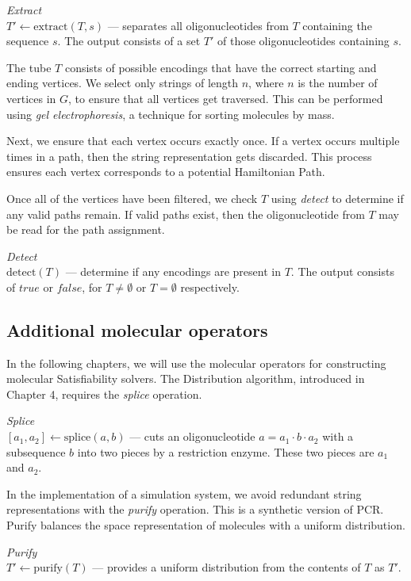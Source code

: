 \begin{definition}
\textit{Extract}\\
$ T' \leftarrow \text{extract}( T, s)$ --- separates all oligonucleotides from $T$ containing the sequence $s$.  The output consists of a set $T'$ of those oligonucleotides containing $s$.
\end{definition}

The tube $T$ consists of possible encodings that have the correct starting and ending vertices. We select only strings of length $n$, where $n$ is the number of vertices in $G$, to ensure that all vertices get traversed.  This can be performed using \textit{gel electrophoresis}, a technique for sorting molecules by mass.

Next, we ensure that each vertex occurs exactly once.  If a vertex occurs multiple times in a path, then the string representation gets discarded.  This process ensures each vertex corresponds to a potential Hamiltonian Path.

Once all of the vertices have been filtered, we check $T$ using \textit{detect} to determine if any valid paths remain.  If valid paths exist, then the oligonucleotide from $T$ may be read for the path assignment.

\begin{definition}
\textit{Detect}\\
$ \text{detect}( T)$ --- determine if any encodings are present in $T$.  The output consists of $true$ or $false$, for $T \neq \emptyset$ or $T = \emptyset$ respectively.
\end{definition}

\subsection{Additional molecular operators}

In the following chapters, we will use the molecular operators for constructing molecular {\sc Satisfiability} solvers.  The Distribution algorithm, introduced in Chapter 4, requires the \textit{splice} operation.
\begin{definition}
\textit{Splice}\\
$[a_1, a_2] \leftarrow \text{splice}(a, b)$ --- cuts an oligonucleotide $a = a_1 \cdot b \cdot a_2$ with a subsequence $b$ into two pieces by a restriction enzyme.    These two pieces are $a_1$ and $a_2$.
\end{definition}

In the implementation of a simulation system, we avoid redundant string representations with the \textit{purify} operation.  This is a synthetic version of PCR.  Purify balances the space representation of molecules with a uniform distribution.
\begin{definition}
\textit{Purify}\\
$T' \leftarrow \text{purify}(T)$ --- provides a uniform distribution from the contents of $T$ as $T'$.
\end{definition}

